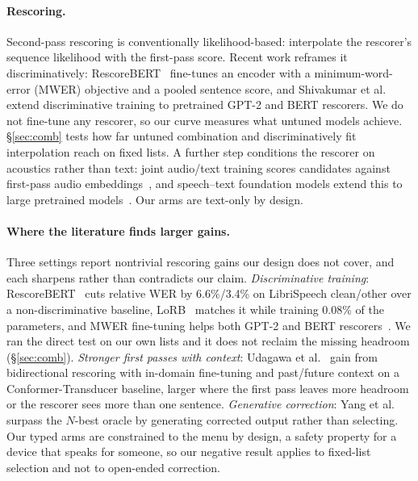 \documentclass[11pt]{article}
\begin{document}
\paragraph{Rescoring.} Second-pass rescoring is conventionally likelihood-based: interpolate
the rescorer's sequence likelihood with the first-pass score. Recent work reframes it
discriminatively: RescoreBERT~\cite{rescorebert} fine-tunes an encoder with a
minimum-word-error (MWER) objective and a pooled sentence score, and Shivakumar et
al.~\cite{shivakumar2023disc} extend discriminative training to pretrained GPT-2 and BERT
rescorers. We do not fine-tune any rescorer, so our curve measures what untuned models achieve.
\S\ref{sec:comb} tests how far untuned combination and discriminatively fit interpolation
reach on fixed lists. A further step conditions the rescorer on acoustics rather than
text: joint audio/text training scores candidates against first-pass audio
embeddings~\cite{kim2022joint}, and speech--text foundation models extend this to large
pretrained models~\cite{shivakumar2024speechtext}. Our arms are text-only by design.

\paragraph{Where the literature finds larger gains.} Three settings report nontrivial
rescoring gains our design does not cover, and each sharpens rather than contradicts our
claim. \emph{Discriminative training}: RescoreBERT~\cite{rescorebert} cuts relative WER by
6.6\%/3.4\% on LibriSpeech clean/other over a non-discriminative baseline,
LoRB~\cite{lob2023} matches it while training 0.08\% of the parameters, and MWER
fine-tuning helps both GPT-2 and BERT rescorers~\cite{shivakumar2023disc}. We ran the
direct test on our own lists and it does not reclaim the missing headroom
(\S\ref{sec:comb}). \emph{Stronger first passes with context}: Udagawa et
al.~\cite{udagawa2022} gain from bidirectional rescoring with in-domain fine-tuning and
past/future context on a Conformer-Transducer baseline, larger where the first pass leaves
more headroom or the rescorer sees more than one sentence. \emph{Generative correction}:
Yang et al.~\cite{yang2023generative} surpass the $N$-best oracle by generating corrected
output rather than selecting. Our typed arms are constrained to the menu by design, a
safety property for a device that speaks for someone, so our negative result applies to
fixed-list selection and not to open-ended correction.
\end{document}
